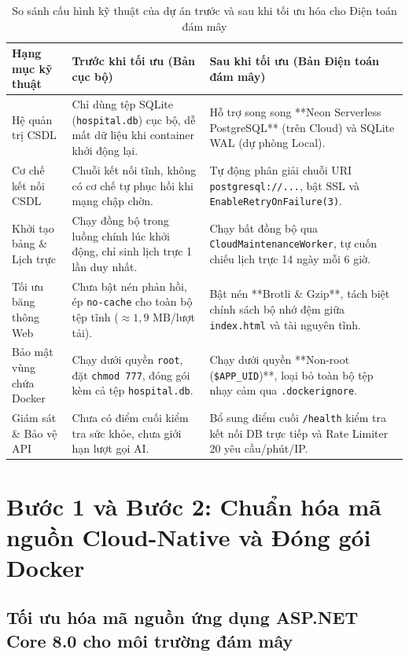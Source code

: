 \begin{table}[H]
\caption{So sánh cấu hình kỹ thuật của dự án trước và sau khi tối ưu hóa cho Điện toán đám mây}
\label{tab:cloud_optimization_diff}
\centering
\begin{tabular}{|p{3.2cm}|p{5.2cm}|p{5.6cm}|}
\hline
\textbf{Hạng mục kỹ thuật} & \textbf{Trước khi tối ưu (Bản cục bộ)} & \textbf{Sau khi tối ưu (Bản Điện toán đám mây)} \\
\hline
Hệ quản trị CSDL & Chỉ dùng tệp SQLite (\texttt{hospital.db}) cục bộ, dễ mất dữ liệu khi container khởi động lại. & Hỗ trợ song song **Neon Serverless PostgreSQL** (trên Cloud) và SQLite WAL (dự phòng Local). \\
\hline
Cơ chế kết nối CSDL & Chuỗi kết nối tĩnh, không có cơ chế tự phục hồi khi mạng chập chờn. & Tự động phân giải chuỗi URI \texttt{postgresql://...}, bật SSL và \texttt{EnableRetryOnFailure(3)}. \\
\hline
Khởi tạo bảng \& Lịch trực & Chạy đồng bộ trong luồng chính lúc khởi động, chỉ sinh lịch trực 1 lần duy nhất. & Chạy bất đồng bộ qua \texttt{CloudMaintenanceWorker}, tự cuốn chiếu lịch trực 14 ngày mỗi 6 giờ. \\
\hline
Tối ưu băng thông Web & Chưa bật nén phản hồi, ép \texttt{no-cache} cho toàn bộ tệp tĩnh ($\approx 1{,}9\text{ MB}$/lượt tải). & Bật nén **Brotli \& Gzip**, tách biệt chính sách bộ nhớ đệm giữa \texttt{index.html} và tài nguyên tĩnh. \\
\hline
Bảo mật vùng chứa Docker & Chạy dưới quyền \texttt{root}, đặt \texttt{chmod 777}, đóng gói kèm cả tệp \texttt{hospital.db}. & Chạy dưới quyền **Non-root (\texttt{\$APP\_UID})**, loại bỏ toàn bộ tệp nhạy cảm qua \texttt{.dockerignore}. \\
\hline
Giám sát \& Bảo vệ API & Chưa có điểm cuối kiểm tra sức khỏe, chưa giới hạn lượt gọi AI. & Bổ sung điểm cuối \texttt{/health} kiểm tra kết nối DB trực tiếp và Rate Limiter 20 yêu cầu/phút/IP. \\
\hline
\end{tabular}
\end{table}

\section{Bước 1 và Bước 2: Chuẩn hóa mã nguồn Cloud-Native và Đóng gói Docker}

\subsection{Tối ưu hóa mã nguồn ứng dụng ASP.NET Core 8.0 cho môi trường đám mây}

